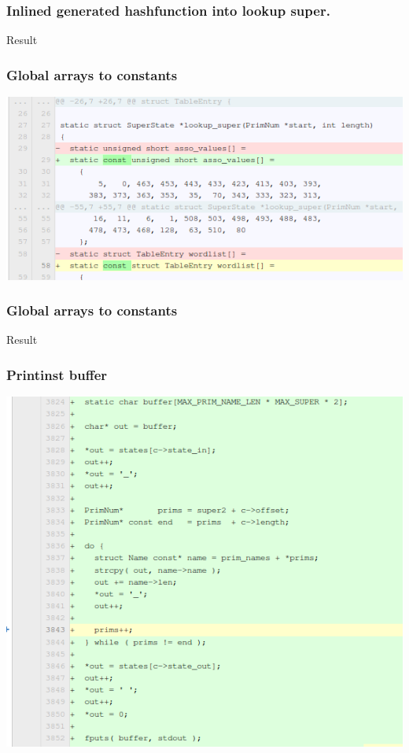 \documentclass{beamer}
\begin{document}
\begin{frame}\frametitle{Inlined generated hashfunction into lookup super.}
\begin{center}
Result
\end{center}
\end{frame}

\begin{frame}\frametitle{Global arrays to constants}
\begin{center}
\includegraphics[scale=0.4]{shots/const.png}
\end{center}
\end{frame}

\begin{frame}\frametitle{Global arrays to constants}
\begin{center}
Result
\end{center}
\end{frame}

\begin{frame}\frametitle{Printinst buffer}
\begin{center}
\includegraphics[scale=0.4]{shots/printinst1.png}
\end{center}
\end{frame}
\end{document}
